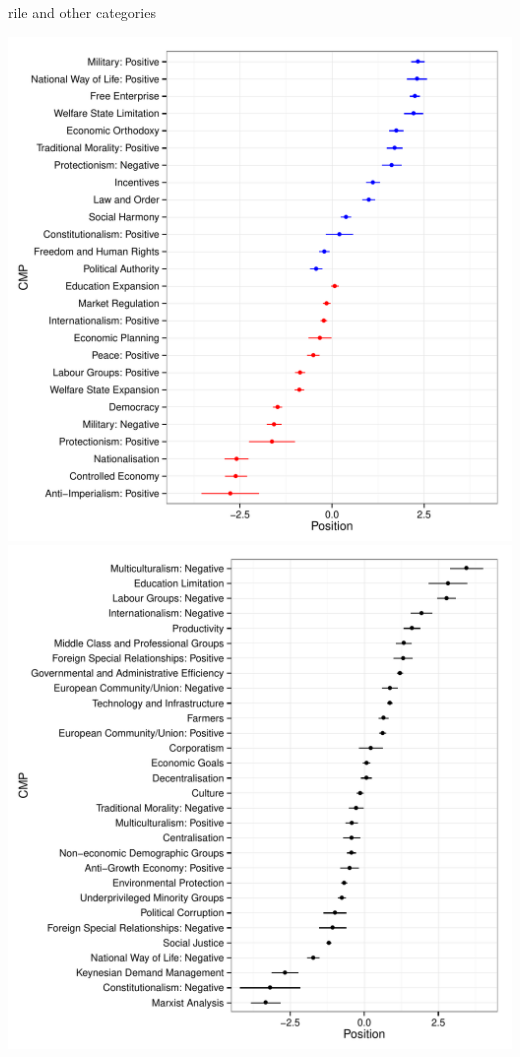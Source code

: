\documentclass{hertieteaching}
\begin{document}
\begin{frame}{rile and other categories}

\centerline{\includegraphics[scale=0.4]{pictures/rile-cats}\pause \includegraphics[scale=0.4]{pictures/non-rile-cats}}
\end{frame}
\end{document}
